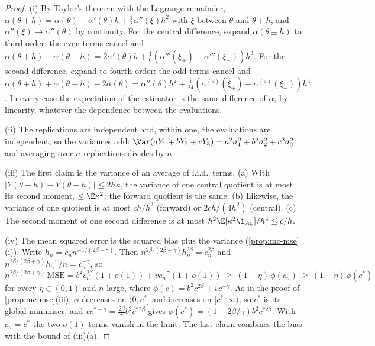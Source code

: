 \begin{proof}
(i) By Taylor's theorem with the Lagrange remainder,
$\alpha(\theta+h)=\alpha(\theta)+\alpha'(\theta)h+\frac12\alpha''(\xi)h^2$ with $\xi$ between
$\theta$ and $\theta+h$, and $\alpha''(\xi)\to\alpha''(\theta)$ by continuity. For the central
difference, expand $\alpha(\theta\pm h)$ to third order: the even terms cancel and
$\alpha(\theta+h)-\alpha(\theta-h)=2\alpha'(\theta)h+\frac16(\alpha'''(\xi_+)+\alpha'''(\xi_-))h^3$.
For the second difference, expand to fourth order: the odd terms cancel and
$\alpha(\theta+h)+\alpha(\theta-h)-2\alpha(\theta)=\alpha''(\theta)h^2+\frac1{24}(\alpha^{(4)}(\xi_+)+\alpha^{(4)}(\xi_-))h^4$.
In every case the expectation of the estimator is the same difference of $\alpha$, by linearity,
whatever the dependence between the evaluations.

(ii) The replications are independent and, within one, the evaluations are independent, so
the variances add: $\Var(aY_1+bY_2+cY_3)=a^2\sigma_1^2+b^2\sigma_2^2+c^2\sigma_3^2$, and averaging
over $n$ replications divides by $n$.

(iii) The first claim is the variance of an average of i.i.d.\ terms. (a) With
$|Y(\theta+h)-Y(\theta-h)|\le2h\kappa$, the variance of one central quotient is at most its
second moment, $\le\E\kappa^2$; the forward quotient is the same. (b) Likewise, the variance
of one quotient is at most $ch/h^2$ (forward) or $2ch/(4h^2)$ (central). (c) The second moment
of one second difference is at most $h^2\E[\kappa^2\1_{A_h}]/h^4\le c/h$.

(iv) The mean squared error is the squared bias plus the variance
(\cref{prop:mc-mse}(i)). Write $h_n=c_nn^{-1/(2\beta+\gamma)}$. Then
$n^{2\beta/(2\beta+\gamma)}h_n^{2\beta}=c_n^{2\beta}$ and
$n^{2\beta/(2\beta+\gamma)}h_n^{-\gamma}/n=c_n^{-\gamma}$, so
\[
  n^{2\beta/(2\beta+\gamma)}\,\mathrm{MSE}=b^2c_n^{2\beta}(1+o(1))+vc_n^{-\gamma}(1+o(1))
  \ \ge\ (1-\eta)\,\phi(c_n)\ \ge\ (1-\eta)\,\phi(c^*)
\]
for every $\eta\in(0,1)$ and $n$ large, where $\phi(c)=b^2c^{2\beta}+vc^{-\gamma}$. As in the
proof of \cref{prop:mc-mse}(iii), $\phi$ decreases on $(0,c^*]$ and increases on $[c^*,\infty)$, so $c^*$
is its global minimiser, and $vc^{*-\gamma}=\frac{2\beta}{\gamma}b^2c^{*2\beta}$ gives
$\phi(c^*)=(1+2\beta/\gamma)b^2c^{*2\beta}$. With $c_n=c^*$ the two $o(1)$ terms vanish in the
limit. The last claim combines the bias with the bound of (iii)(a).
\end{proof}

